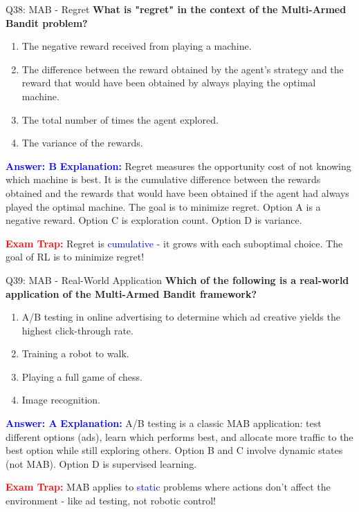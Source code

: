 \documentclass[8pt]{beamer}
\begin{document}
	\begin{frame}{Q38: MAB - Regret}
		\fontsize{6.5}{7.5}\selectfont
		\textbf{What is "regret" in the context of the Multi-Armed Bandit problem?}
		
		\begin{enumerate}
			\item The negative reward received from playing a machine.
			\item The difference between the reward obtained by the agent's strategy and the reward that would have been obtained by always playing the optimal machine.
			\item The total number of times the agent explored.
			\item The variance of the rewards.
		\end{enumerate}
		
		\vspace{0.1cm}
		\textcolor{blue}{\textbf{Answer: B}}
		\vspace{0.1cm}
		\textcolor{blue}{\textbf{Explanation:}} Regret measures the opportunity cost of not knowing which machine is best. It is the cumulative difference between the rewards obtained and the rewards that would have been obtained if the agent had always played the optimal machine. The goal is to minimize regret. Option A is a negative reward. Option C is exploration count. Option D is variance.
		
		\textcolor{red}{\textbf{Exam Trap:}} Regret is \textcolor{blue}{cumulative} - it grows with each suboptimal choice. The goal of RL is to minimize regret!
	\end{frame}
	
	\begin{frame}{Q39: MAB - Real-World Application}
		\fontsize{6.5}{7.5}\selectfont
		\textbf{Which of the following is a real-world application of the Multi-Armed Bandit framework?}
		
		\begin{enumerate}
			\item A/B testing in online advertising to determine which ad creative yields the highest click-through rate.
			\item Training a robot to walk.
			\item Playing a full game of chess.
			\item Image recognition.
		\end{enumerate}
		
		\vspace{0.1cm}
		\textcolor{blue}{\textbf{Answer: A}}
		\vspace{0.1cm}
		\textcolor{blue}{\textbf{Explanation:}} A/B testing is a classic MAB application: test different options (ads), learn which performs best, and allocate more traffic to the best option while still exploring others. Option B and C involve dynamic states (not MAB). Option D is supervised learning.
		
		\textcolor{red}{\textbf{Exam Trap:}} MAB applies to \textcolor{blue}{static} problems where actions don't affect the environment - like ad testing, not robotic control!
	\end{frame}
	
\end{document}
